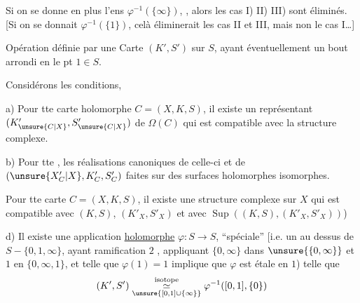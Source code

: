 Si on se donne en plus  l'ens
 $\varphi^{-1}(\{\infty\})$, , alors les cas I) II) III)
sont éliminés. [Si on se donnait
$\varphi^{-1}(\{1\})$, celà éliminerait les cas
II et III, mais non le cas I\ldots]

Opération  définie par une 
Carte $(K',S')$ sur $S$, ayant éventuellement
un bout arrondi en le pt $1\in S$.

Considérons les conditions,

a) Pour tte carte holomorphe $C=(X,K,S)$, il existe
un représentant $(K'_{\unsure{C|X}},S'_{\unsure{C|X}})$ de $\Omega(C)$ qui est
compatible avec la structure complexe.

b) Pour tte  , les réalisations
  canoniques de celle-ci et de
$(\unsure{X'_C|X},K'_C,S'_C)$  faites sur des surfaces
 holomorphes isomorphes.

 Pour tte carte $C=(X,K,S)$,  il existe
une structure complexe sur $X$
qui est compatible avec $(K,S)$, $(K'_X,S'_X)$ et
avec $\operatorname{Sup}((K,S),(K'_X,S'_X))$)


d) Il existe une application \uline{holomorphe}
$\varphi:S\longrightarrow S$,  ``spéciale'' [i.e. un
  au dessus de $S-\{0,1,\infty\}$,
 ayant ramification \deleted{\unsure{=}}\inserted{$\leq$}$2$
, appliquant $\{0,\infty\}$ dans $\unsure{\{0,\infty\}}$ et
$1$ en $\{0,\infty,1\}$, et telle que  $\varphi(1)=1$
implique que $\varphi$ est étale en $1$) telle que
\[
(K',S')\underset{\unsure{[0,1]\cup\{\infty\}}}{\overset{\text{isotope}}{\simeq}}\varphi^{-1}([0,1],\{0\})
\]

